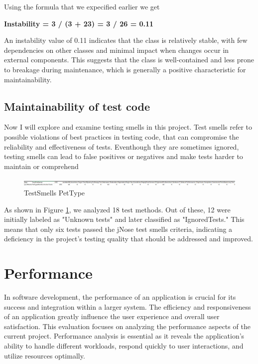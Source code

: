 \documentclass[a4paper,11pt,openright,BCOR=15mm]{scrbook}
\begin{document}
Using the formula that we expecified earlier we get

\textbf{Instability = 3 / (3 + 23) = 3 / 26 = 0.11}

An instability value of 0.11 indicates that the class is relatively stable, with few dependencies on other classes and minimal impact when changes occur in external components. This suggests that the class is well-contained and less prone to breakage during maintenance, which is generally a positive characteristic for maintainability.



\section{Maintainability of test code}
Now I will explore and examine testing smells in this project. Test smells refer to possible violations of best practices in testing code, that can compromise the reliability and effectiveness of tests. Eventhough they are sometimes ignored, testing smells can lead to false positives or negatives and make tests harder to maintain or comprehend

\begin{figure}[H]
	\centering
	\includegraphics[width=\textwidth]{figs/Maintainability/TestSmells.png}
	\caption{TestSmells PetType}
	\label{fig:TestSmells}
  \end{figure}

  As shown in Figure \ref{fig:TestSmells}, we analyzed 18 test methods. Out of these, 12 were initially labeled as "Unknown tests" and later classified as "IgnoredTests." This means that only six tests passed the jNose test smells criteria, indicating a deficiency in the project's testing quality that should be addressed and improved.







	\chapter{Performance}
In software development, the performance of an application is crucial for its success and integration within a larger system. The efficiency and responsiveness of an application greatly influence the user experience and overall user satisfaction. This evaluation focuses on analyzing the performance aspects of the current project. Performance analysis is essential as it reveals the application’s ability to handle different workloads, respond quickly to user interactions, and utilize resources optimally.
\end{document}
